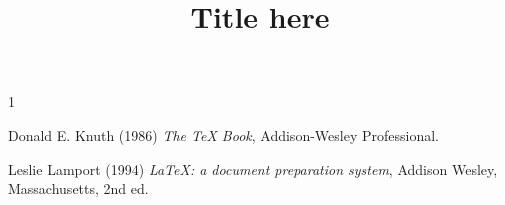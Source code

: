 \documentclass{article}
\title{Title here}
\date{}
\newcommand{\useNatbib}{0}
\begin{document}
\clearpage
\maketitle   %
\thispagestyle{empty}  %
\pagestyle{empty}      %

\begin{comment}
  \begin{center}
    \Large
    Manual title
    \vspace{0.5cm}
  \end{center}
\end{comment}


\lipsum

\if \useNatbib 1

  \else
  \begin{thebibliography}{9}
    Donald E. Knuth (1986) \emph{The \TeX{} Book}, Addison-Wesley Professional.

    Leslie Lamport (1994) \emph{\LaTeX: a document preparation system}, Addison
    Wesley, Massachusetts, 2nd ed.
  \end{thebibliography}
  \fi
\end{document}
